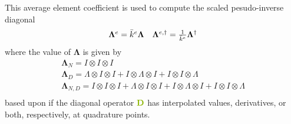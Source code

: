 This average element coefficient is used to compute the scaled pesudo-inverse diagonal
\begin{equation}
\begin{array}{c c}
\mathbf{\Lambda}^e = \bar{k}^e \mathbf{\Lambda}  &  \mathbf{\Lambda}^{e, \dagger} = \frac{1}{\bar{k}^e} \mathbf{\Lambda}^{\dagger}
\end{array}
\end{equation}
where the value of $\mathbf{\Lambda}$ is given by
\begin{equation}
\begin{array}{c}
\mathbf{\Lambda}_N      = I \otimes I \otimes I                                                                                             \\
\mathbf{\Lambda}_D      = \Lambda \otimes I \otimes I + I \otimes \Lambda \otimes I + I \otimes I \otimes \Lambda                           \\
\mathbf{\Lambda}_{N, D} = I \otimes I \otimes I + \Lambda \otimes I \otimes  I + I \otimes \Lambda \otimes I + I \otimes I \otimes \Lambda  \\
\end{array}
\end{equation}
based upon if the diagonal operator ${\color{applegreen}\mathbf{D}}$ has interpolated values, derivatives, or both, respectively, at quadrature points.
